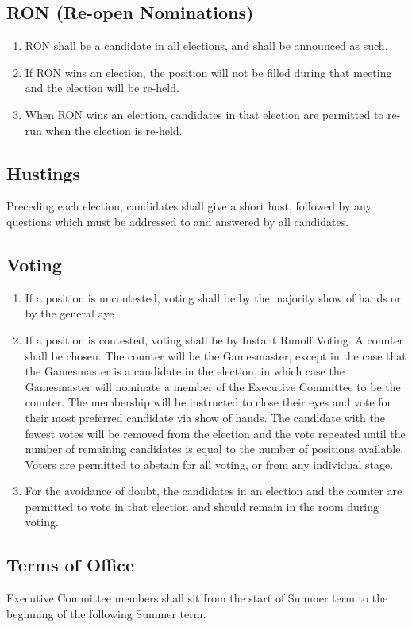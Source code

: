 \documentclass[hidelinks, 12pt, a4paper]{article}
\begin{document}
\subsection{RON (Re-open Nominations)}
\begin{enumerate}
	\item RON shall be a candidate in all elections, and shall be announced as such.
	\item If RON wins an election, the position will not be filled during that meeting and the election will be re-held.
	\item When RON wins an election, candidates in that election are permitted to re-run when the election is re-held.
\end{enumerate}

\subsection{Hustings}
Preceding each election, candidates shall give a short hust, followed by any questions which must be addressed to and answered by all candidates.

\subsection{Voting}
\begin{enumerate}
	\item If a position is uncontested, voting shall be by the majority show of hands or by the general aye
	\item If a position is contested, voting shall be by Instant Runoff Voting. A counter shall be chosen. The counter will be the Gamesmaster, except in the case that the Gamesmaster is a candidate in the election, in which case the Gamesmaster will nominate a member of the Executive Committee to be the counter. The membership will be instructed to close their eyes and vote for their most preferred candidate via show of hands. The candidate with the fewest votes will be removed from the election and the vote repeated until the number of remaining candidates is equal to the number of positions available. Voters are permitted to abstain for all voting, or from any individual stage.
	\item For the avoidance of doubt, the candidates in an election and the counter are permitted to vote in that election and should remain in the room during voting.
\end{enumerate}

\subsection{Terms of Office}
Executive Committee members shall sit from the start of Summer term to the beginning of the following Summer term.
\end{document}
